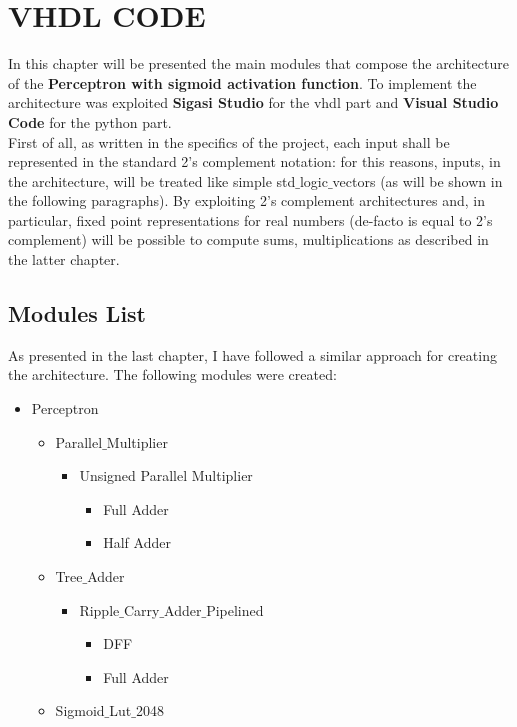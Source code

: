 \section{VHDL CODE}
In this chapter will be presented the main modules that compose the architecture of the \textbf{Perceptron with sigmoid activation function}. To implement the architecture was exploited \textbf{Sigasi  Studio} for the vhdl part and \textbf{Visual Studio Code} for the python part. \\
First of all, as written in the specifics of the project, each input shall be represented in the standard 2's complement notation: for this reasons, inputs, in the architecture, will be treated like simple std$\_$logic$\_$vectors (as will be shown in the following paragraphs). By exploiting 2's complement architectures and, in particular, fixed point representations for real numbers (de-facto is equal to 2's complement) will be possible to compute sums, multiplications as described in the latter chapter. 
\subsection{Modules List}
As presented in the last chapter, I have followed a similar approach for creating the architecture. The following modules were created:

\begin{itemize}
	\item Perceptron
	\begin{itemize}
		\item Parallel$\_$Multiplier
  		\begin{itemize}
  			\item Unsigned Parallel Multiplier
  			\begin{itemize}
	  			\item Full Adder
	  			\item Half Adder
  			\end{itemize}
		\end{itemize}
	\end{itemize}
	\begin{itemize}
		\item Tree$\_$Adder
		\begin{itemize}
			\item Ripple$\_$Carry$\_$Adder$\_$Pipelined
			\begin{itemize}
				\item DFF
				\item Full Adder
			\end{itemize} 
		\end{itemize} 
	\end{itemize}
	\begin{itemize}
		\item Sigmoid$\_$Lut$\_$2048
	\end{itemize}
\end{itemize}

